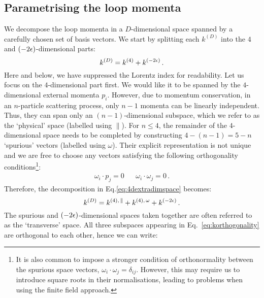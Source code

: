 \documentclass[main.tex]{subfiles}
\begin{document}
\subsection{Parametrising the loop momenta}
We decompose the loop momenta in a $D$-dimensional space spanned by a carefully chosen set of basis vectors. We start by splitting each $k^{(D)}$ into the $4$ and $(-2\epsilon)$-dimensional parts:
\begin{equation} \label{eq:4dextradimspace}
    k^{(D)} = k^{(4)} + k^{(-2\epsilon)}\,.
\end{equation}
Here and below, we have suppressed the Lorentz index for readability. Let us focus on the $4$-dimensional part first. We would like it to be spanned by the $4$-dimensional external momenta $p_i$. However, due to momentum conservation, in an $n$-particle scattering process, only $n-1$ momenta can be linearly independent. Thus, they can span only an $(n-1)$-dimensional subspace, which we refer to as the `physical' space (labelled using $\parallel$). For $n\le4$, the remainder of the $4$-dimensional space needs to be completed by constructing $4-(n-1) = 5-n$ `spurious' vectors (labelled using $\omega$). Their explicit representation is not unique and we are free to choose any vectors satisfying the following orthogonality conditions\footnote{It is also common to impose a stronger condition of orthonormality between the spurious space vectors, $\omega_i \cdot \omega_j = \delta_{ij}$. However, this may require us to introduce square roots in their normalisations, leading to problems when using the finite field approach.}:
\begin{align} \label{eq:orthogonalityconditions}
    \omega_i \cdot p_j = 0 && \omega_i \cdot \omega_j = 0\,.
\end{align}
Therefore, the decomposition in Eq.\ref{eq:4dextradimspace} becomes:
\begin{equation} \label{eq:korthogonality}
    k^{(D)} = k^{(4),\, \parallel} + k^{(4),\, \omega} + k^{(-2\epsilon)}\,.
\end{equation}
The spurious and $(-2\epsilon)$-dimensional spaces taken together are often referred to as the `transverse' space. All three subspaces appearing in Eq.~\ref{eq:korthogonality} are orthogonal to each other, hence we can write:
\end{document}
